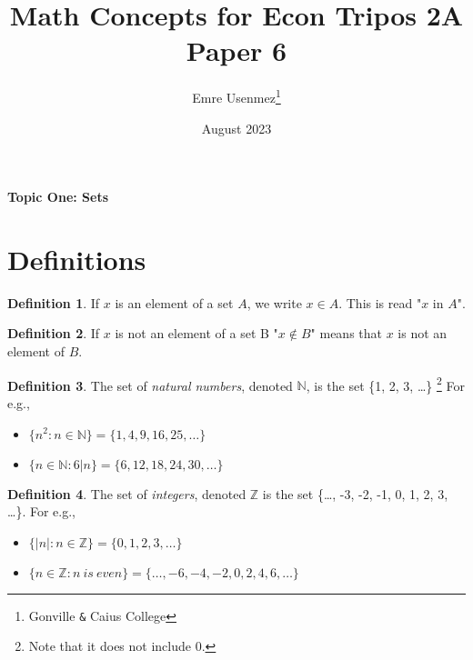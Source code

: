 \documentclass{amsart} %
\title{Math Concepts for Econ Tripos 2A Paper 6}
\author{Emre Usenmez\thanks{Gonville \verb|&| Caius College}}
\date{August 2023}
\theoremstyle{definition} %
\newtheorem*{dfn}{Definition} %
\theoremstyle{proposition} %
\theoremstyle{remark} %
\begin{document}


\begin{center}
      \textbf{Topic One: Sets}
\end{center}



\section{\textbf{Definitions}}


\begin{dfn}
\boxed{\in} \quad If $x$ is an element of a set $A$, we write $x \in A$. This is read "$x$ in $A$". %
\end{dfn}

\begin{dfn}
\boxed{\not\in} \quad If $x$ is not an element of a set B "$x \not\in B$" means that $x$ is not an element of $B$.
\end{dfn}

\begin{dfn}
 \quad The set of \emph{natural numbers}, denoted $\mathbb{N}$, is the set \{1, 2, 3, \dots\} \footnote{Note that it does not include 0.} For e.g.,
    \begin{itemize}
          \item $\{n^2:n \in \mathbb{N} \} = \{1, 4, 9, 16, 25, \dots\}$
          \item $\{n \in \mathbb{N} : 6|n\} = \{6, 12, 18, 24, 30, \dots\}$
    \end{itemize}
\end{dfn}

\begin{dfn}
 \quad The set of \emph{integers}, denoted $\mathbb{Z}$ is the set \{\dots, -3, -2, -1, 0, 1, 2, 3, \dots \}. For e.g.,
    \begin{itemize}
          \item $\{|n|:n \in \mathbb{Z} \} = \{0, 1, 2, 3, \dots\}$
          \item $\{n \in \mathbb{Z}: n\ is\ even\} = \{\dots, -6, -4, -2, 0, 2, 4, 6, \dots \}$ %
    \end{itemize}
\end{dfn}
\end{document}
